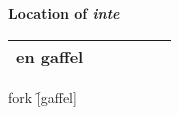 
\begin{flushleft}
    \textbf{Location of \textsl{inte}}
\end{flushleft}

\begin{center}
    \begin{tabular}{|c c c c c c|}
        \hline
        en gaffel &  &  &  &  &  \\
        \hline
    \end{tabular}
\end{center}

\begin{questions}
    \begin{multicols}{2}
        \raggedcolumns
        \question fork \f[gaffel]
    \end{multicols}
\end{questions}
